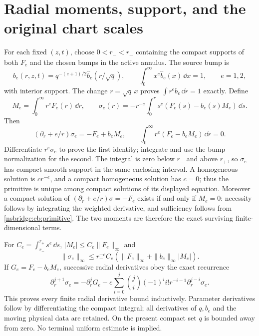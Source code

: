 \section{Radial moments, support, and the original chart scales}
For each fixed $(z,t)$, choose $0<r_-<r_+$ containing the compact
supports of both $F_e$ and the chosen bumps in the active annulus.
The source bump is
\[
 b_e(r,z,t)=q^{-(e+1)/2}\widehat b_e(r/\sqrt q),\qquad
 \int_0^\infty x^e\widehat b_e(x)\,\dd x=1,\qquad e=1,2,
\]
with interior support. The change $r=\sqrt q\,x$ proves
$\int r^eb_e\,\dd r=1$ exactly. Define
\begin{equation}
 M_e=\int_0^\infty r^eF_e(r)\,\dd r,\qquad
 \sigma_e(r)=-r^{-e}\int_0^r s^e(F_e(s)-b_e(s)M_e)\,\dd s .
 \label{nsbridge:cb:primitive}
\end{equation}
Then
\begin{equation}
 (\partial_r+e/r)\sigma_e=-F_e+b_eM_e,\qquad
 \int_0^\infty r^e(F_e-b_eM_e)\,\dd r=0. \label{nsbridge:cb:radial}
\end{equation}
Differentiate $r^e\sigma_e$ to prove the first identity; integrate and
use the bump normalization for the second. The integral is zero below
$r_-$ and above $r_+$, so $\sigma_e$ has compact smooth support in the
same enclosing interval. A homogeneous solution is $cr^{-e}$, and a
compact homogeneous solution has $c=0$; thus the primitive is unique
among compact solutions of its displayed equation. Moreover a compact
solution of $(\partial_r+e/r)\sigma=-F_e$ exists if and only if $M_e=0$:
necessity follows by integrating the weighted derivative, and
sufficiency follows from \eqref{nsbridge:cb:primitive}. The two moments are
therefore the exact surviving finite-dimensional terms.

For $C_e=\int_{r_-}^{r_+}s^e\,\dd s$,
$|M_e|\le C_e\|F_e\|_\infty$ and
\[
 \|\sigma_e\|_\infty\le r_-^{-e}C_e
        (\|F_e\|_\infty+\|b_e\|_\infty|M_e|).
\]
If $G_e=F_e-b_eM_e$, successive radial derivatives obey the exact recurrence
\[
 \partial_r^{j+1}\sigma_e=-\partial_r^jG_e
 -e\sum_{i=0}^j \binom{j}{i}(-1)^ii!r^{-i-1}
                              \partial_r^{j-i}\sigma_e .
\]
This proves every finite radial derivative bound inductively. Parameter
derivatives follow by differentiating the compact integral; all derivatives
of $q,b_e$ and the moving physical data are retained. On the present compact
set $q$ is bounded away from zero. No terminal uniform estimate is implied.

